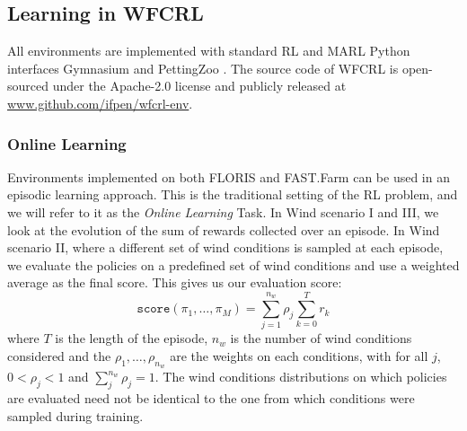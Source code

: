 \documentclass{article}
\newcommand{\md}[1]{{\color{red}#1}}
\begin{document}
\subsection{Learning in WFCRL}\label{sec:bench-learning}

All environments are implemented with standard RL and MARL Python interfaces Gymnasium \cite{openai-gym} and PettingZoo \cite{pettingzoo}. The source code of WFCRL is open-sourced under the Apache-2.0 license and publicly released at \url{www.github.com/ifpen/wfcrl-env}. 

\subsubsection{Online Learning}\label{sec:bench-online}

Environments implemented on both FLORIS and FAST.Farm can be used in an episodic learning approach. This is the traditional setting of the RL problem, and we will refer to it as the \textit{Online Learning} Task.
In Wind scenario I and III, we look at the evolution of the sum of rewards collected over an episode. 
In Wind scenario II, where a different set of wind conditions is sampled at each episode, we evaluate the policies on a predefined set of wind conditions and use a weighted average as the final score. This gives us our evaluation score:
%
\begin{equation}\label{eq:eval_eq}
    \texttt{score}(\pi_1, \dots, \pi_M) = \sum_{j=1}^{n_w} \rho_j  \sum_{k=0}^T r_k
\end{equation}
%
where $T$ is the length of the episode,  $n_w$ is the number of wind conditions considered and the $\rho_1, \dots, \rho_{n_w}$ are the weights on each conditions, with for all $j$, $ 0 < \rho_j < 1$ and $\sum_j^{n_w} \rho_j = 1$. The wind conditions distributions on which policies are evaluated need not be identical to the one from which conditions were sampled during training.
\end{document}
